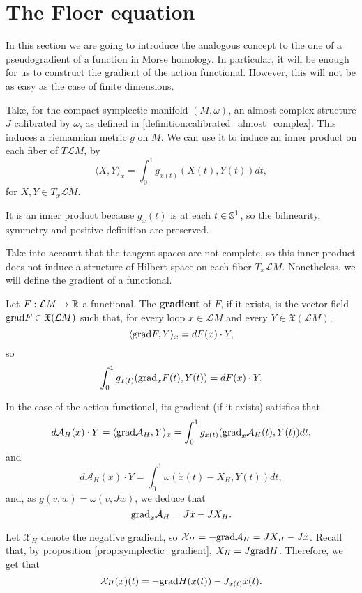 \section{The Floer equation}

In this section we are going to introduce the analogous concept to the one of a pseudogradient of a function in Morse homology. In particular, it will be enough for us to construct the gradient of the action functional. However, this will not be as easy as the case of finite dimensions.

Take, for the compact symplectic manifold $(M,\omega)$, an almost complex structure $J$ calibrated by $\omega$, as defined in \ref{definition:calibrated_almost_complex}. This induces a riemannian metric $g$ on $M$. We can use it to induce an inner product on each fiber of $T\mathcal{L}M$, by
\[\langle X, Y \rangle_x = \int_0^1 g_{x(t)} (X(t), Y(t)) d t,\]
for $X,Y \in T_x\mathcal{L}M$.

It is an inner product because $g_x(t)$ is at each $t \in \mathbb{S}^1$, so the bilinearity, symmetry and positive definition are preserved.

Take into account that the tangent spaces are not complete, so this inner product does not induce a structure of Hilbert space on each fiber $T_x\mathcal{L}M$. Nonetheless, we will define the gradient of a functional.

\begin{deff}
Let $F : \mathcal{L}M \rightarrow \mathbb{R}$ a functional. The {\bf gradient} of $F$, if it exists, is the vector field $\mathrm{grad} F \in \mathfrak{X}(\mathcal{L}M)$ such that, for every loop $x \in \mathcal{L}M$ and every $Y \in \mathfrak{X}(\mathcal{L}M)$,
\[\langle \mathrm{grad} F, Y \rangle_x = d F(x) \cdot Y ,\]
so
\[\int_0^1 g_{x(t)}(\mathrm{grad}_xF(t),Y(t)) = d F(x) \cdot Y .\]
\end{deff}

In the case of the action functional, its gradient (if it exists) satisfies that
\[d \mathcal{A}_H(x) \cdot Y = \langle \mathrm{grad}\mathcal{A}_H, Y \rangle_x = \int_0^1 g_{x(t)}(\mathrm{grad}_x\mathcal{A}_H(t),Y(t)) d t ,\]
and
\[d \mathcal{A}_H(x) \cdot Y = \int_0^1 \omega(\dot{x}(t)-X_H,Y(t)) d t ,\]
and, as $g(v,w) = \omega(v,Jw)$, we deduce that
\[\mathrm{grad}_x\mathcal{A}_H = J\dot{x} - J X_H .\]

Let $\mathcal{X}_H$ denote the negative gradient, so $\mathcal{X}_H = - \mathrm{grad}\mathcal{A}_H = J X_H - J \dot{x}$. Recall that, by proposition \ref{prop:symplectic_gradient}, $X_H = J \mathrm{grad} H$. Therefore, we get that
\[\mathcal{X}_H(x)(t) = - \mathrm{grad} H(x(t)) - J_{x(t)} \dot{x}(t) .\]

